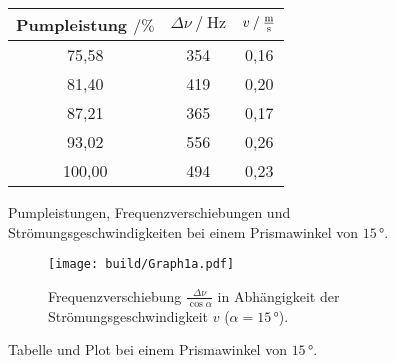 \begin{figure}
    \begin{subtable}{0.43\textwidth}
        \centering
       \begin{tabular}{c c c}
        \toprule 
        {Pumpleistung $\mathbin{/}\%$} & {$\Delta \nu \mathbin{/} \unit{\hertz}$} & {$v \mathbin{/} \unit{\frac{\meter}{\second}}$}  \\
        \midrule 
             75,58   &   354  & 0,16 \\
             81,40   &   419  & 0,20 \\
             87,21   &   365  & 0,17 \\
             93,02   &   556  & 0,26 \\
            100,00   &   494  & 0,23 \\
        \bottomrule
       \end{tabular}
       \caption{Pumpleistungen, Frequenzverschiebungen und Strömungsgeschwindigkeiten bei einem Prismawinkel von $15 \,°$.}
       \label{tab:1winkel1} 
       \qquad
    \end{subtable}
    \begin{subfigure}{0.57\textwidth} 
        \centering
        \texttt{[image: build/Graph1a.pdf]}
        \caption{Frequenzverschiebung $\frac{\Delta \nu}{\cos\alpha}$ in Abhängigkeit der Strömungsgeschwindigkeit $v$ ($\alpha = 15 \,°$).} 
        \label{fig:graph1a}
        \qquad
    \end{subfigure}
    \caption{Tabelle und Plot bei einem Prismawinkel von $15 \,°$.} 
\end{figure} 

